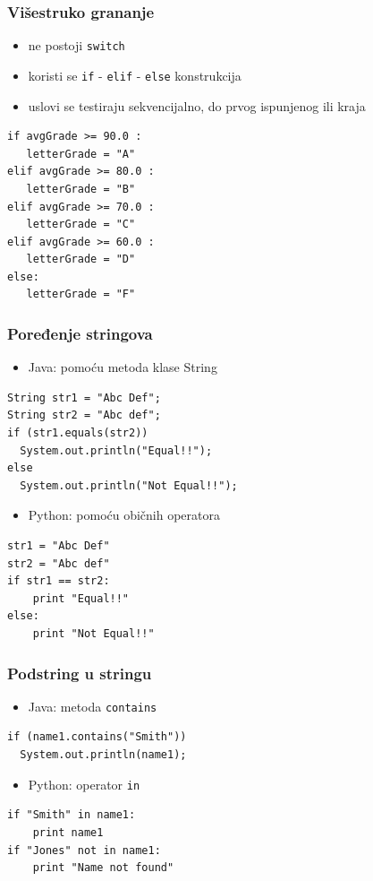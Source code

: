 \documentclass[compress]{beamer}
\begin{document}
\begin{frame}[fragile]
\frametitle{Višestruko grananje}
\begin{itemize}
  \item ne postoji \texttt{switch}
  \item koristi se \texttt{if} - \texttt{elif} - \texttt{else} konstrukcija
  \item uslovi se testiraju sekvencijalno, do prvog ispunjenog ili kraja
\end{itemize}
\begin{verbatim}
if avgGrade >= 90.0 :
   letterGrade = "A"
elif avgGrade >= 80.0 :
   letterGrade = "B"
elif avgGrade >= 70.0 :
   letterGrade = "C"
elif avgGrade >= 60.0 :
   letterGrade = "D"
else:
   letterGrade = "F"
\end{verbatim}
\end{frame}

\begin{frame}[fragile]
\frametitle{Poređenje stringova}
\begin{itemize}
  \item Java: pomoću metoda klase String
\end{itemize}
\begin{verbatim}
String str1 = "Abc Def";
String str2 = "Abc def";
if (str1.equals(str2))
  System.out.println("Equal!!");
else
  System.out.println("Not Equal!!");
\end{verbatim}
\begin{itemize}
  \item Python: pomoću običnih operatora
\end{itemize}
\begin{verbatim}
str1 = "Abc Def"
str2 = "Abc def"
if str1 == str2:
    print "Equal!!"
else:
    print "Not Equal!!"
\end{verbatim}
\end{frame}

\begin{frame}[fragile]
\frametitle{Podstring u stringu}
\begin{itemize}
  \item Java: metoda \texttt{contains}
\end{itemize}
\begin{verbatim}
if (name1.contains("Smith"))
  System.out.println(name1);
\end{verbatim}
\begin{itemize}
  \item Python: operator \texttt{in}
\end{itemize}
\begin{verbatim}
if "Smith" in name1:
    print name1
if "Jones" not in name1:
    print "Name not found"  
\end{verbatim}
\end{frame}
\end{document}
